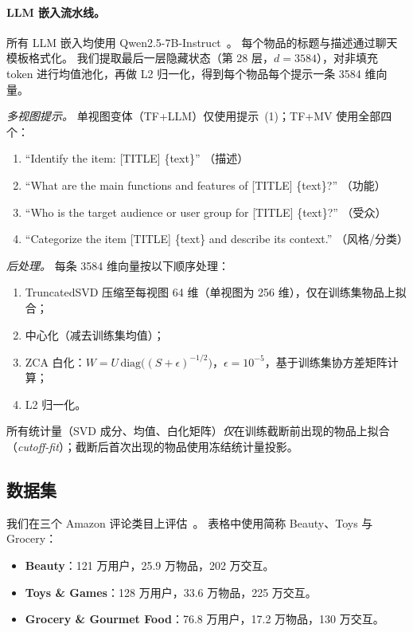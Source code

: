 \documentclass[sigconf,natbib=true,anonymous]{acmart}
\newcommand{\tfllm}{\textsc{TF+LLM}\xspace}
\newcommand{\tfmv}{\textsc{TF+MV}\xspace}
\begin{document}
\paragraph{LLM 嵌入流水线。}
所有 LLM 嵌入均使用 Qwen2.5-7B-Instruct~\cite{qwen2024qwen25}。
每个物品的标题与描述通过聊天模板格式化。
我们提取最后一层隐藏状态（第 28 层，$d{=}3584$），对非填充 token 进行均值池化，再做 L2 归一化，得到每个物品每个提示一条 3584 维向量。

\smallskip\noindent\emph{多视图提示。}
单视图变体（\tfllm）仅使用提示~(1)；\tfmv 使用全部四个：
\begin{enumerate}[leftmargin=2em,itemsep=1pt,label=(\arabic*)]
\item ``Identify the item: [TITLE] \{text\}'' \hfill （描述）
\item ``What are the main functions and features of [TITLE] \{text\}?'' \hfill （功能）
\item ``Who is the target audience or user group for [TITLE] \{text\}?'' \hfill （受众）
\item ``Categorize the item [TITLE] \{text\} and describe its context.'' \hfill （风格/分类）
\end{enumerate}

\smallskip\noindent\emph{后处理。}
每条 3584 维向量按以下顺序处理：
\begin{enumerate}[leftmargin=2em,itemsep=1pt,label=(\roman*)]
\item TruncatedSVD 压缩至每视图 64 维（单视图为 256 维），仅在训练集物品上拟合；
\item 中心化（减去训练集均值）；
\item ZCA 白化：$W = U\,\mathrm{diag}\bigl((S + \epsilon)^{-1/2}\bigr)$，$\epsilon{=}10^{-5}$，基于训练集协方差矩阵计算；
\item L2 归一化。
\end{enumerate}
所有统计量（SVD 成分、均值、白化矩阵）\emph{仅}在训练截断前出现的物品上拟合（\emph{cutoff-fit}）；截断后首次出现的物品使用冻结统计量投影。

\subsection{数据集}

我们在三个 Amazon 评论类目上评估~\cite{mcauley2015amazon,ni2019amazon}。
表格中使用简称 Beauty、Toys 与 Grocery：
\begin{itemize}[leftmargin=*,itemsep=1pt]
\item \textbf{Beauty}：121 万用户，25.9 万物品，202 万交互。
\item \textbf{Toys \& Games}：128 万用户，33.6 万物品，225 万交互。
\item \textbf{Grocery \& Gourmet Food}：76.8 万用户，17.2 万物品，130 万交互。
\end{itemize}
\end{document}
